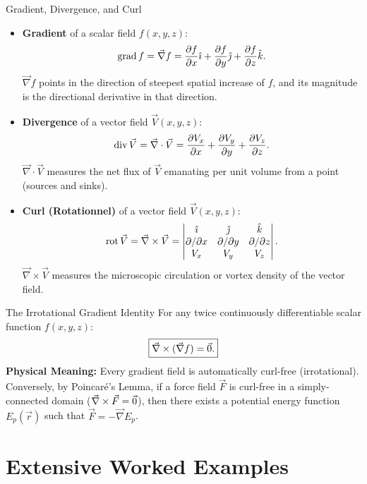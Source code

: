 \begin{definitionbox}{Gradient, Divergence, and Curl}
\begin{itemize}[leftmargin=1.4em,itemsep=3pt]
  \item \textbf{Gradient} of a scalar field $f(x, y, z)$:
        \[
        \operatorname{grad} f = \vec{\nabla} f = \frac{\partial f}{\partial x}\hat{\imath} + \frac{\partial f}{\partial y}\hat{\jmath} + \frac{\partial f}{\partial z}\hat{k}.
        \]
        $\vec{\nabla} f$ points in the direction of steepest spatial increase of $f$, and its magnitude is the directional derivative in that direction.
  \item \textbf{Divergence} of a vector field $\vec{V}(x, y, z)$:
        \[
        \operatorname{div} \vec{V} = \vec{\nabla}\cdot\vec{V} = \frac{\partial V_x}{\partial x} + \frac{\partial V_y}{\partial y} + \frac{\partial V_z}{\partial z}.
        \]
        $\vec{\nabla}\cdot\vec{V}$ measures the net flux of $\vec{V}$ emanating per unit volume from a point (sources and sinks).
  \item \textbf{Curl (Rotationnel)} of a vector field $\vec{V}(x, y, z)$:
        \[
        \operatorname{rot} \vec{V} = \vec{\nabla}\times\vec{V} = \begin{vmatrix} \hat{\imath} & \hat{\jmath} & \hat{k} \\ \partial/\partial x & \partial/\partial y & \partial/\partial z \\ V_x & V_y & V_z \end{vmatrix}.
        \]
        $\vec{\nabla}\times\vec{V}$ measures the microscopic circulation or vortex density of the vector field.
\end{itemize}
\end{definitionbox}

\begin{lawbox}{The Irrotational Gradient Identity}
For any twice continuously differentiable scalar function $f(x, y, z)$:
\[
\boxed{\vec{\nabla}\times(\vec{\nabla} f) = \vec{0}.}
\]
\textbf{Physical Meaning:} Every gradient field is automatically curl-free (irrotational).
Conversely, by Poincaré's Lemma, if a force field $\vec{F}$ is curl-free in a simply-connected domain ($\vec{\nabla}\times\vec{F} = \vec{0}$), then there exists a potential energy function $E_p(\vec{r})$ such that $\vec{F} = -\vec{\nabla} E_p$.
\end{lawbox}

\section{Extensive Worked Examples}

